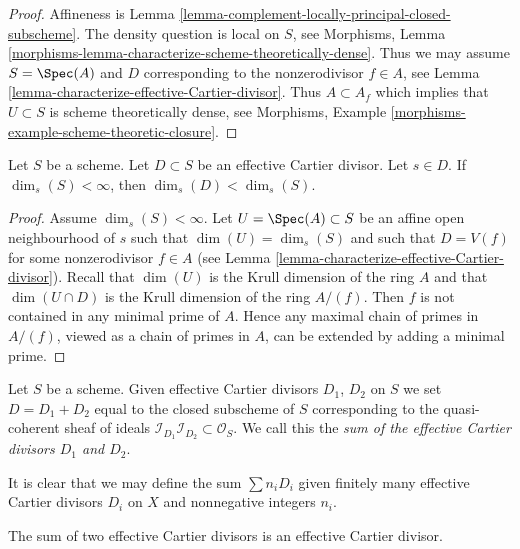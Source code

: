\begin{proof}
Affineness is Lemma \ref{lemma-complement-locally-principal-closed-subscheme}.
The density question is local on $S$, see
Morphisms, Lemma \ref{morphisms-lemma-characterize-scheme-theoretically-dense}.
Thus we may assume $S = \Spec(A)$ and $D$ corresponding to the
nonzerodivisor $f \in A$, see
Lemma \ref{lemma-characterize-effective-Cartier-divisor}.
Thus $A \subset A_f$ which implies that $U \subset S$ is
scheme theoretically dense, see
Morphisms, Example \ref{morphisms-example-scheme-theoretic-closure}.
\end{proof}

\begin{lemma}
\label{lemma-effective-Cartier-makes-dimension-drop}
Let $S$ be a scheme.
Let $D \subset S$ be an effective Cartier divisor.
Let $s \in D$.
If $\dim_s(S) < \infty$, then $\dim_s(D) < \dim_s(S)$.
\end{lemma}

\begin{proof}
Assume $\dim_s(S) < \infty$.
Let $U = \Spec(A) \subset S$ be an affine open neighbourhood
of $s$ such that $\dim(U) = \dim_s(S)$ and such that $D = V(f)$
for some nonzerodivisor $f \in A$ (see
Lemma \ref{lemma-characterize-effective-Cartier-divisor}).
Recall that $\dim(U)$ is the Krull dimension of the ring $A$
and that $\dim(U \cap D)$ is the Krull dimension of the ring $A/(f)$.
Then $f$ is not contained in any minimal prime of $A$.
Hence any maximal chain of primes in $A/(f)$, viewed as a chain
of primes in $A$, can be extended by adding a minimal prime.
\end{proof}

\begin{definition}
\label{definition-sum-effective-Cartier-divisors}
Let $S$ be a scheme. Given effective Cartier divisors
$D_1$, $D_2$ on $S$ we set $D = D_1 + D_2$ equal to the
closed subscheme of $S$ corresponding to the quasi-coherent
sheaf of ideals
$\mathcal{I}_{D_1}\mathcal{I}_{D_2} \subset \mathcal{O}_S$.
We call this the {\it sum of the effective Cartier divisors
$D_1$ and $D_2$}.
\end{definition}

\noindent
It is clear that we may define the sum $\sum n_iD_i$ given
finitely many effective Cartier divisors $D_i$ on $X$
and nonnegative integers $n_i$.

\begin{lemma}
\label{lemma-sum-effective-Cartier-divisors}
The sum of two effective Cartier divisors is an effective
Cartier divisor.
\end{lemma}

